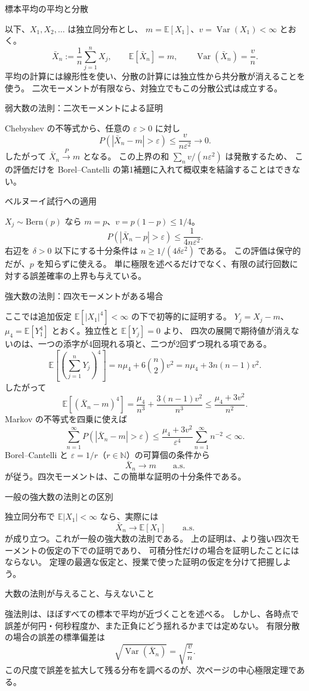 \documentclass[a4paper,10pt,pdflatex,ja=standard,jafont=ipaex-type1,
  magstyle=real,scale=1]{bxjsarticle}
\newcommand{\topic}[1]{\par\vspace{5pt}
  {\large\sffamily\mdseries\color{accent}#1}\par\vspace{2pt}}
\newcommand{\N}{\mathbb N}
\newcommand{\E}{\mathbb E}
\newcommand{\Var}{\operatorname{Var}}
\begin{document}
\topic{標本平均の平均と分散}
以下、$X_1,X_2,\ldots$ は独立同分布とし、
$m=\E[X_1]$、$v=\Var(X_1)<\infty$ とおく。
$$\bar X_n:=\frac1n\sum_{j=1}^nX_j,\qquad
 \E[\bar X_n]=m,\qquad\Var(\bar X_n)=\frac v n.$$
平均の計算には線形性を使い、分散の計算には独立性から共分散が消えることを使う。
二次モーメントが有限なら、対独立でもこの分散公式は成立する。

\topic{弱大数の法則：二次モーメントによる証明}
Chebyshev の不等式から、任意の $\varepsilon>0$ に対し
$$P(|\bar X_n-m|>\varepsilon)
 \le\frac{v}{n\varepsilon^2}\longrightarrow0.$$
したがって $\bar X_n\xrightarrow{P}m$ となる。
この上界の和 $\sum_n v/(n\varepsilon^2)$ は発散するため、
この評価だけを Borel--Cantelli の第1補題に入れて概収束を結論することはできない。

\topic{ベルヌーイ試行への適用}
$X_j\sim\mathrm{Bern}(p)$ なら $m=p$、$v=p(1-p)\le1/4$。
$$P(|\bar X_n-p|>\varepsilon)\le\frac1{4n\varepsilon^2}.$$
右辺を $\delta>0$ 以下にする十分条件は $n\ge1/(4\delta\varepsilon^2)$ である。
この評価は保守的だが、$p$ を知らずに使える。
単に極限を述べるだけでなく、有限の試行回数に対する誤差確率の上界も与えている。

\newpage
\topic{強大数の法則：四次モーメントがある場合}
ここでは追加仮定 $\E[|X_1|^4]<\infty$ の下で初等的に証明する。
$Y_j=X_j-m$、$\mu_4=\E[Y_1^4]$ とおく。独立性と $\E[Y_j]=0$ より、
四次の展開で期待値が消えないのは、一つの添字が4回現れる項と、二つが2回ずつ現れる項である。
$$
 \E\left[\left(\sum_{j=1}^nY_j\right)^4\right]
 =n\mu_4+6\binom n2v^2=n\mu_4+3n(n-1)v^2.
$$
したがって
$$\E[(\bar X_n-m)^4]
 =\frac{\mu_4}{n^3}+\frac{3(n-1)v^2}{n^3}
 \le\frac{\mu_4+3v^2}{n^2}.$$
Markov の不等式を四乗に使えば
$$\sum_{n=1}^\infty P(|\bar X_n-m|>\varepsilon)
 \le\frac{\mu_4+3v^2}{\varepsilon^4}\sum_{n=1}^\infty n^{-2}<\infty.$$
Borel--Cantelli と $\varepsilon=1/r$（$r\in\N$）の可算個の条件から
$$\bar X_n\longrightarrow m\qquad\text{a.s.}$$
が従う。四次モーメントは、この簡単な証明の十分条件である。

\topic{一般の強大数の法則との区別}
独立同分布で $\E|X_1|<\infty$ なら、実際には
$$\bar X_n\to\E[X_1]\qquad\text{a.s.}$$
が成り立つ。これが一般の強大数の法則である。
上の証明は、より強い四次モーメントの仮定の下での証明であり、
可積分性だけの場合を証明したことにはならない。
定理の最適な仮定と、授業で使った証明の仮定を分けて把握しよう。

\topic{大数の法則が与えること、与えないこと}
強法則は、ほぼすべての標本で平均が近づくことを述べる。
しかし、各時点で誤差が何円・何秒程度か、また正負にどう揺れるかまでは定めない。
有限分散の場合の誤差の標準偏差は
$$\sqrt{\Var(\bar X_n)}=\sqrt{\frac vn}.$$
この尺度で誤差を拡大して残る分布を調べるのが、次ページの中心極限定理である。
\end{document}
